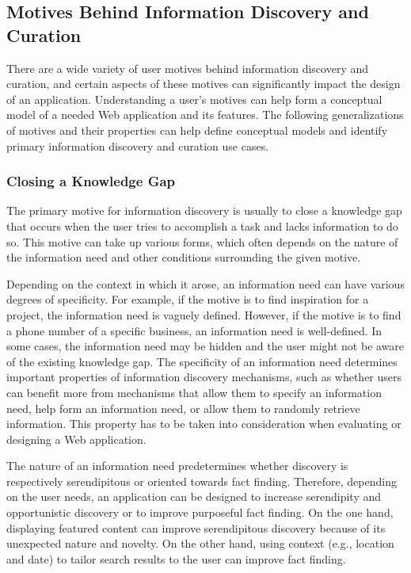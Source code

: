 \documentclass{sigchi}
\begin{document}
{\subsection{Motives Behind Information Discovery and Curation}


There are a wide variety of user motives behind information discovery and curation, and certain aspects of these motives can significantly impact the design of an application. Understanding a user's motives can help form a conceptual model of a needed Web application and its features. The following generalizations of motives and their properties can help define conceptual models and identify primary information discovery and curation use cases.  

{\subsubsection{Closing a Knowledge Gap}
The primary motive for information discovery is usually to close a knowledge gap that occurs when the user tries to accomplish a task and lacks information to do so. This motive can take up various forms, which often depends on the nature of the information need and other conditions surrounding the given motive.        

Depending on the context in which it arose, an information need can have various degrees of specificity. For example, if the motive is to find inspiration for a project, the information need is vaguely defined. However, if the motive is to find a phone number of a specific business, an information need is well-defined. In some cases, the information need may be hidden and the user might not be aware of the existing knowledge gap. The specificity of an information need determines important properties of information discovery mechanisms, such as whether users can benefit more from mechanisms that allow them to specify an information need, help form an information need, or allow them to randomly retrieve information. This property has to be taken into consideration when evaluating or designing a Web application. 

The nature of an information need predetermines whether discovery is respectively serendipitous or oriented towards fact finding. Therefore, depending on the user needs, an application can be designed to increase serendipity and opportunistic discovery or to improve purposeful fact finding. On the one hand, displaying featured content can improve serendipitous discovery because of its unexpected nature and novelty. On the other hand, using context (e.g., location and date) to tailor search results to the user can improve fact finding. 

}}
\end{document}
